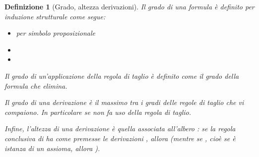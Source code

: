 \documentclass[12pt,a4paper,openright,twoside]{report}
\newtheorem{dfn}[thm]{Definizione}
\begin{document}
\begin{dfn}[Grado, altezza derivazioni]
Il \emph{grado di una formula}  \`e definito per induzione strutturale come segue:
\begin{itemize}
	\item  \qquad per  simbolo proposizionale
	\item 
	\item 
\end{itemize}

Il \emph{grado di un'applicazione della regola di taglio} \`e definito come il grado della formula che elimina.

Il \emph{grado}  \emph{di una derivazione} \`e il massimo tra i gradi delle regole di taglio che vi compaiono. In particolare  se  non fa uso della regola di taglio.

Infine, l'\emph{altezza}  \emph{di una derivazione} \`e quella associata all'albero : se la regola conclusiva di  ha come premesse le derivazioni , allora  (mentre se , cio\`e se  \`e istanza di un assioma, allora ).
\end{dfn}
\end{document}
